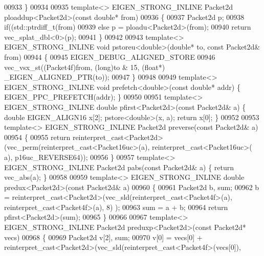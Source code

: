 \begin{DoxyCode}
{00933 \}
00934 
00935 \textcolor{keyword}{template}<> EIGEN\_STRONG\_INLINE Packet2d ploaddup<Packet2d>(\textcolor{keyword}{const} \textcolor{keywordtype}{double}*   from)
00936 \{
00937   Packet2d p;
00938   \textcolor{keywordflow}{if}((std::ptrdiff\_t(from) %
00939   \textcolor{keywordflow}{else}                                  p = ploadu<Packet2d>(from);
00940   \textcolor{keywordflow}{return} vec\_splat\_dbl<0>(p);
00941 \}
00942 
00943 \textcolor{keyword}{template}<> EIGEN\_STRONG\_INLINE \textcolor{keywordtype}{void} pstoreu<double>(\textcolor{keywordtype}{double}*  to, \textcolor{keyword}{const} Packet2d& from)
00944 \{
00945   EIGEN\_DEBUG\_ALIGNED\_STORE
00946   vec\_vsx\_st((Packet4f)from, (\textcolor{keywordtype}{long})to & 15, (\textcolor{keywordtype}{float}*) \_EIGEN\_ALIGNED\_PTR(to));
00947 \}
00948 
00949 \textcolor{keyword}{template}<> EIGEN\_STRONG\_INLINE \textcolor{keywordtype}{void} prefetch<double>(\textcolor{keyword}{const} \textcolor{keywordtype}{double}* addr) \{ EIGEN\_PPC\_PREFETCH(addr); \}
00950 
00951 \textcolor{keyword}{template}<> EIGEN\_STRONG\_INLINE \textcolor{keywordtype}{double}  pfirst<Packet2d>(\textcolor{keyword}{const} Packet2d& a) \{ \textcolor{keywordtype}{double} EIGEN\_ALIGN16 x[2]; 
      pstore<double>(x, a); \textcolor{keywordflow}{return} x[0]; \}
00952 
00953 \textcolor{keyword}{template}<> EIGEN\_STRONG\_INLINE Packet2d preverse(\textcolor{keyword}{const} Packet2d& a)
00954 \{
00955   \textcolor{keywordflow}{return} \textcolor{keyword}{reinterpret\_cast<}Packet2d\textcolor{keyword}{>}(vec\_perm(reinterpret\_cast<Packet16uc>(a), reinterpret\_cast<Packet16uc>(
      a), p16uc\_REVERSE64));
00956 \}
00957 \textcolor{keyword}{template}<> EIGEN\_STRONG\_INLINE Packet2d pabs(\textcolor{keyword}{const} Packet2d& a) \{ \textcolor{keywordflow}{return} vec\_abs(a); \}
00958 
00959 \textcolor{keyword}{template}<> EIGEN\_STRONG\_INLINE \textcolor{keywordtype}{double} predux<Packet2d>(\textcolor{keyword}{const} Packet2d& a)
00960 \{
00961   Packet2d b, sum;
00962   b   = \textcolor{keyword}{reinterpret\_cast<}Packet2d\textcolor{keyword}{>}(vec\_sld(reinterpret\_cast<Packet4f>(a), reinterpret\_cast<Packet4f>(a), 8)
      );
00963   sum = a + b;
00964   \textcolor{keywordflow}{return} pfirst<Packet2d>(sum);
00965 \}
00966 
00967 \textcolor{keyword}{template}<> EIGEN\_STRONG\_INLINE Packet2d preduxp<Packet2d>(\textcolor{keyword}{const} Packet2d* vecs)
00968 \{
00969   Packet2d v[2], sum;
00970   v[0] = vecs[0] + \textcolor{keyword}{reinterpret\_cast<}Packet2d\textcolor{keyword}{>}(vec\_sld(reinterpret\_cast<Packet4f>(vecs[0]), 
}
\end{DoxyCode}
